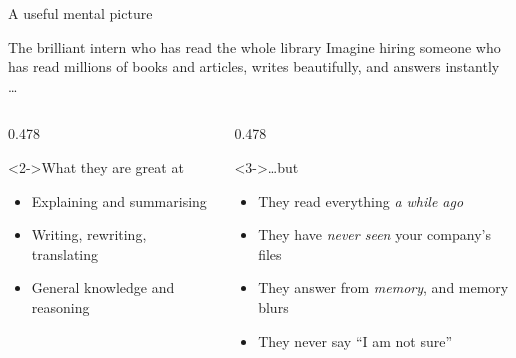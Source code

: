 \documentclass[aspectratio=169,11pt]{beamer}
\begin{document}
\begin{frame}{A useful mental picture}
  \begin{block}{The brilliant intern who has read the whole library}
    Imagine hiring someone who has read millions of books and articles,
    writes beautifully, and answers instantly \dots
  \end{block}
  \medskip
  \begin{columns}[T,onlytextwidth]
    \begin{column}{0.478\textwidth}
      \begin{exampleblock}<2->{What they are great at}
        \begin{itemize}
          \item Explaining and summarising
          \item Writing, rewriting, translating
          \item General knowledge and reasoning
        \end{itemize}
      \end{exampleblock}
    \end{column}
    \begin{column}{0.478\textwidth}
      \begin{alertblock}<3->{\dots but}
        \begin{itemize}
          \item They read everything \emph{a while ago}
          \item They have \emph{never seen} your company's files
          \item They answer from \emph{memory}, and memory blurs
          \item They never say ``I am not sure''
        \end{itemize}
      \end{alertblock}
    \end{column}
  \end{columns}
\end{frame}
\end{document}
